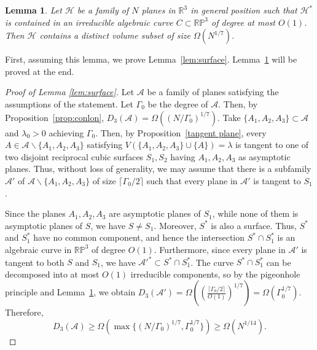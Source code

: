 \documentclass[a4paper,oneside,10pt]{amsart}
\newtheorem{lem}{Lemma}
\begin{document}
\begin{lem} \label{lem:curve}
Let $\mathcal{H}$ be a family of $N$ planes in $\mathbb{R}^3$ in general position such that $\mathcal{H}^{*}$ is contained in an irreducible algebraic curve $C \subset \mathbb{RP}^3$ of degree at most $O(1)$. Then $\mathcal{H}$ contains a distinct volume subset of size $\Omega (N^{1/7})$.
\end{lem}
First, assuming this lemma, we prove Lemma~\ref{lem:surface}. Lemma~\ref{lem:curve} will be proved at the end.
\begin{proof}[Proof of Lemma \ref{lem:surface}]
Let $\mathcal{A}$ be a family of planes satisfying the assumptions of the statement. Let $\Gamma_0$ be the degree of $\mathcal{A}$.
Then, by Proposition~\ref{prop:conlon}, $D_3 (\mathcal{A}) = \Omega ((N/\Gamma_0)^{1/7})$.
Take $\{ A_1, A_2, A_3 \} \subset \mathcal{A}$ and $\lambda_0 > 0$ achieving $\Gamma_0$.
Then, by Proposition~\ref{tangent plane}, every $A \in \mathcal{A} \backslash \{ A_1, A_2, A_3 \}$ satisfying $V( \{ A_1, A_2, A_3 \} \cup \{A \} ) = \lambda$ is tangent to one of two disjoint reciprocal cubic surfaces $S_1, S_2$ having $A_1, A_2, A_3$ as asymptotic planes. Thus, without loss of generality, we may assume that there is a subfamily $\mathcal{A'}$ of $\mathcal{A} \backslash \{ A_1, A_2, A_3 \}$ of size $\lceil \Gamma_0/2 \rceil$ such that every plane in $\mathcal{A'}$ is tangent to $S_1$.


Since the planes $A_1, A_2, A_3$ are asymptotic planes of $S_1$, while none of them is asymptotic planes of $S$, we have $S \neq S_1$. 
Moreover, $S^{*}$ is also a surface. 
Thus, $S^{*}$ and $S_1^{*}$ have no common component, and hence
the intersection $S^{*} \cap S_1^{*}$ is an algebraic curve in $\mathbb{RP}^3$ of degree $O(1)$.
Furthermore, since every plane in $\mathcal{A'}$ is tangent to both $S$ and $S_1$,
we have $\mathcal{A'}^{*} \subset S^{*} \cap S_1^{*}$.
The curve $S^{*} \cap S_1^{*}$ can be decomposed into at most $O(1)$ irreducible components, so by the pigeonhole principle and Lemma~\ref{lem:curve},
we obtain $D_3 (\mathcal{A'}) = \Omega \left(\left(\frac{\lceil \Gamma_0 /2 \rceil}{O(1)}\right)^{1/7}\right) = \Omega (\Gamma_0^{1/7})$.
Therefore,
$$
D_3 (\mathcal{A}) \geq \Omega (\max \{ (N/\Gamma_0)^{1/7}, \Gamma_0^{1/7} \}) \geq \Omega (N^{1/14}).
$$
\end{proof}
\end{document}
